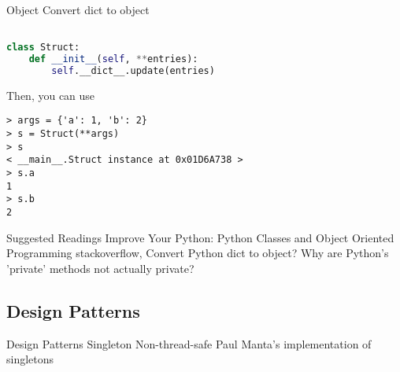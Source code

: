 Object
Convert dict to object

\begin{lstlisting}[language=Python]

class Struct:
    def __init__(self, **entries):
        self.__dict__.update(entries)
\end{lstlisting}

Then, you can use

\begin{lstlisting}
> args = {'a': 1, 'b': 2}
> s = Struct(**args)
> s
< __main__.Struct instance at 0x01D6A738 >
> s.a
1
> s.b
2
\end{lstlisting}

Suggested Readings
Improve Your Python: Python Classes and Object Oriented Programming
stackoverflow, Convert Python dict to object?
Why are Python's 'private' methods not actually private?

\subsection{Design Patterns}

Design Patterns
Singleton
Non-thread-safe
Paul Manta's implementation of singletons


